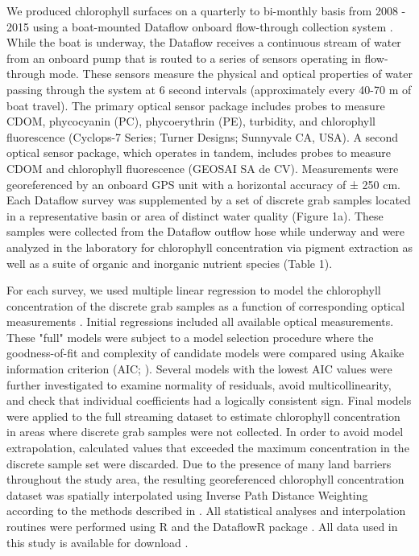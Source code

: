 We produced chlorophyll surfaces on a quarterly to bi-monthly basis from 2008 - 2015 using a boat-mounted Dataflow onboard flow-through collection system \citep{madden1992instrument}. While the boat is underway, the Dataflow receives a continuous stream of water from an onboard pump that is routed to a series of sensors operating in flow-through mode. These sensors measure the physical and optical properties of water passing through the system at 6 second intervals (approximately every 40-70 m of boat travel). The primary optical sensor package includes probes to measure CDOM, phycocyanin (PC), phycoerythrin (PE), turbidity, and chlorophyll fluorescence (Cyclops-7 Series; Turner Designs; Sunnyvale CA, USA). A second optical sensor package, which operates in tandem, includes probes to measure CDOM and chlorophyll fluorescence (GEOSAI SA de CV). Measurements were georeferenced by an onboard GPS unit with a horizontal accuracy of ± 250 cm. Each Dataflow survey was supplemented by a set of discrete grab samples located in a representative basin or area of distinct water quality (Figure 1a). These samples were collected from the Dataflow outflow hose while underway and were analyzed in the laboratory for chlorophyll concentration via pigment extraction as well as a suite of organic and inorganic nutrient species (Table 1).

For each survey, we used multiple linear regression to model the chlorophyll concentration of the discrete grab samples as a function of corresponding optical measurements \citep{seppala_ship_opportunity_2007,seppala_multivariate_2008}. Initial regressions included all available optical measurements. These "full" models were subject to a model selection procedure where the goodness-of-fit and complexity of candidate models were compared using Akaike information criterion (AIC; \citep{venables2002modern}). Several models with the lowest AIC values were further investigated to examine normality of residuals, avoid multicollinearity, and check that individual coefficients had a logically consistent sign. Final models were applied to the full streaming dataset to estimate chlorophyll concentration in areas where discrete grab samples were not collected. In order to avoid model extrapolation, calculated values that exceeded the maximum concentration in the discrete sample set were discarded. Due to the presence of many land barriers throughout the study area, the resulting georeferenced chlorophyll concentration dataset was spatially interpolated using Inverse Path Distance Weighting according to the methods described in \citep{stachelek_application_2015}. All statistical analyses and interpolation routines were performed using R \citep{rcore_2015} and the DataflowR package \citep{dataflowr}. All data used in this study is available for download \citep{madden2017}. 

